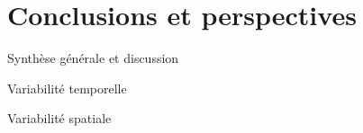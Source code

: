 \chapter*{Conclusions et perspectives}
\newpage

Synthèse générale et discussion


Variabilité temporelle

Variabilité spatiale

